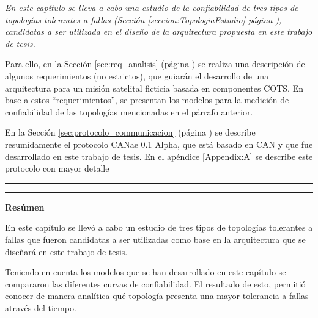\vspace{1cm}

\itshape
En este capítulo se lleva a cabo una estudio de la confiabilidad de tres tipos
de topologías tolerantes a fallas (Sección \ref{seccion:TopologiaEstudio}
página \pageref{seccion:TopologiaEstudio}), candidatas a ser utilizada en el
diseño de la arquitectura propuesta en este trabajo de tesis.

Para ello, en la Sección \ref{sec:req_analisis} (página \pageref{sec:req_analisis})
se realiza una descripción de algunos requerimientos (no estrictos), que guiarán
el desarrollo de una arquitectura para un misión satelital ficticia basada en
componentes COTS. En base a estos ``requerimientos'', se presentan los modelos para
la medición de confiabilidad de las topologías mencionadas en el párrafo anterior. 

En la Sección \ref{sec:protocolo_communicacion} (página \pageref{sec:protocolo_communicacion})
se describe resumídamente el protocolo CANae 0.1 Alpha, que está basado en CAN y
que fue desarrollado en este trabajo de tesis. En el apéndice \ref{Appendix:A}
se describe este protocolo con mayor detalle
\upshape

\noindent\rule{\textwidth}{2pt}

\vspace{1cm}
%





\vspace{1cm}
\noindent\rule{\textwidth}{2pt}

\textbf{\Large{Resúmen}}

En este capítulo se llevó a cabo un estudio de tres tipos de topologías tolerantes
a fallas que fueron candidatas a ser utilizadas como base en la
arquitectura que se diseñará en este trabajo de tesis. 

Teniendo en cuenta los modelos que se han desarrollado en este capítulo se compararon las diferentes curvas de confiabilidad. El resultado de esto, permitió conocer de manera analítica qué topología presenta una mayor tolerancia a fallas através del tiempo.

